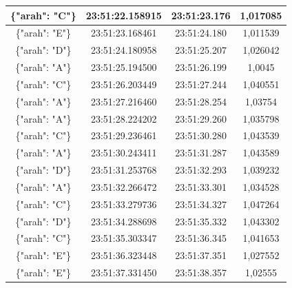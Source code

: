 \begin{table}[htpb]
\begin{tabular}{|ccc|c|}
  \multicolumn{1}{|c|}{\{"arah": "C"\}} & \multicolumn{1}{c|}{23:51:22.158915} & 23:51:23.176       & 1,017085    \\ \hline
  \multicolumn{1}{|c|}{\{"arah": "E"\}} & \multicolumn{1}{c|}{23:51:23.168461} & 23:51:24.180       & 1,011539    \\ \hline
  \multicolumn{1}{|c|}{\{"arah": "D"\}} & \multicolumn{1}{c|}{23:51:24.180958} & 23:51:25.207       & 1,026042    \\ \hline
  \multicolumn{1}{|c|}{\{"arah": "A"\}} & \multicolumn{1}{c|}{23:51:25.194500} & 23:51:26.199       & 1,0045      \\ \hline
  \multicolumn{1}{|c|}{\{"arah": "C"\}} & \multicolumn{1}{c|}{23:51:26.203449} & 23:51:27.244       & 1,040551    \\ \hline
  \multicolumn{1}{|c|}{\{"arah": "A"\}} & \multicolumn{1}{c|}{23:51:27.216460} & 23:51:28.254       & 1,03754     \\ \hline
  \multicolumn{1}{|c|}{\{"arah": "A"\}} & \multicolumn{1}{c|}{23:51:28.224202} & 23:51:29.260       & 1,035798    \\ \hline
  \multicolumn{1}{|c|}{\{"arah": "C"\}} & \multicolumn{1}{c|}{23:51:29.236461} & 23:51:30.280       & 1,043539    \\ \hline
  \multicolumn{1}{|c|}{\{"arah": "A"\}} & \multicolumn{1}{c|}{23:51:30.243411} & 23:51:31.287       & 1,043589    \\ \hline
  \multicolumn{1}{|c|}{\{"arah": "D"\}} & \multicolumn{1}{c|}{23:51:31.253768} & 23:51:32.293       & 1,039232    \\ \hline
  \multicolumn{1}{|c|}{\{"arah": "A"\}} & \multicolumn{1}{c|}{23:51:32.266472} & 23:51:33.301       & 1,034528    \\ \hline
  \multicolumn{1}{|c|}{\{"arah": "C"\}} & \multicolumn{1}{c|}{23:51:33.279736} & 23:51:34.327       & 1,047264    \\ \hline
  \multicolumn{1}{|c|}{\{"arah": "D"\}} & \multicolumn{1}{c|}{23:51:34.288698} & 23:51:35.332       & 1,043302    \\ \hline
  \multicolumn{1}{|c|}{\{"arah": "C"\}} & \multicolumn{1}{c|}{23:51:35.303347} & 23:51:36.345       & 1,041653    \\ \hline
  \multicolumn{1}{|c|}{\{"arah": "E"\}} & \multicolumn{1}{c|}{23:51:36.323448} & 23:51:37.351       & 1,027552    \\ \hline
  \multicolumn{1}{|c|}{\{"arah": "E"\}} & \multicolumn{1}{c|}{23:51:37.331450} & 23:51:38.357       & 1,02555     \\ \hline

\end{tabular}
\end{table}
